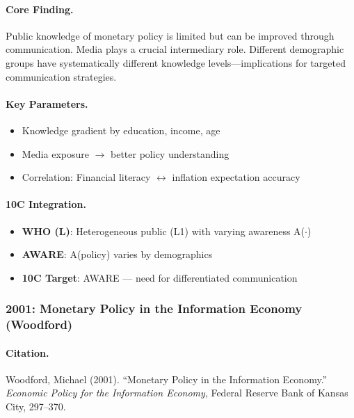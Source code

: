 \paragraph{Core Finding.}
Public knowledge of monetary policy is limited but can be improved through communication.
Media plays a crucial intermediary role. Different demographic groups have systematically
different knowledge levels---implications for targeted communication strategies.

\paragraph{Key Parameters.}
\begin{itemize}[nosep]
  \item Knowledge gradient by education, income, age
  \item Media exposure $\rightarrow$ better policy understanding
  \item Correlation: Financial literacy $\leftrightarrow$ inflation expectation accuracy
\end{itemize}

\paragraph{10C Integration.}
\begin{itemize}[nosep]
  \item \textbf{WHO (L)}: Heterogeneous public (L1) with varying awareness A($\cdot$)
  \item \textbf{AWARE}: A(policy) varies by demographics
  \item \textbf{10C Target}: AWARE  --- need for differentiated communication
\end{itemize}

\subsubsection{2001: Monetary Policy in the Information Economy (Woodford)}

\paragraph{Citation.}
Woodford, Michael (2001). ``Monetary Policy in the Information Economy.''
\textit{Economic Policy for the Information Economy}, Federal Reserve Bank of Kansas City, 297--370.


